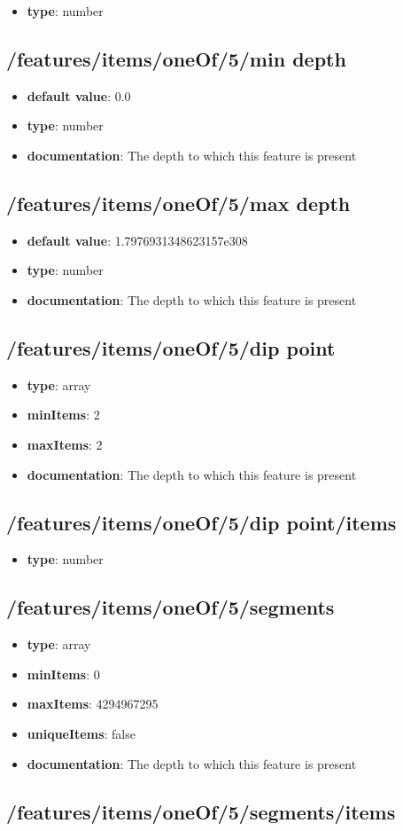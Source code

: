 \begin{itemize}\item {\bf type}: number
\end{itemize}\subsection{/features/items/oneOf/5/min depth}
\begin{itemize}\item {\bf default value}: 0.0
\item {\bf type}: number
\item {\bf documentation}: The depth to which this feature is present
\end{itemize}\subsection{/features/items/oneOf/5/max depth}
\begin{itemize}\item {\bf default value}: 1.7976931348623157e308
\item {\bf type}: number
\item {\bf documentation}: The depth to which this feature is present
\end{itemize}\subsection{/features/items/oneOf/5/dip point}
\begin{itemize}\item {\bf type}: array
\item {\bf minItems}: 2
\item {\bf maxItems}: 2
\item {\bf documentation}: The depth to which this feature is present
\end{itemize}\subsection{/features/items/oneOf/5/dip point/items}
\begin{itemize}\item {\bf type}: number
\end{itemize}\subsection{/features/items/oneOf/5/segments}
\begin{itemize}\item {\bf type}: array
\item {\bf minItems}: 0
\item {\bf maxItems}: 4294967295
\item {\bf uniqueItems}: false
\item {\bf documentation}: The depth to which this feature is present
\end{itemize}\subsection{/features/items/oneOf/5/segments/items}
